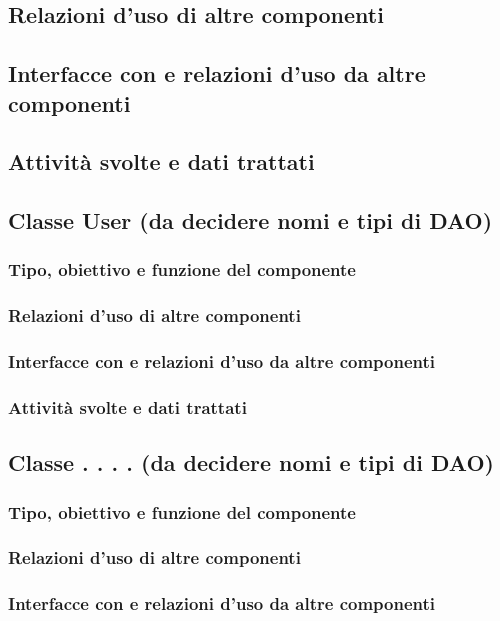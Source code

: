 \subsection*{Relazioni d'uso di altre componenti}
\subsection*{Interfacce con e relazioni d'uso da altre componenti}
\subsection*{Attivit\`a svolte e dati trattati}

\subsection{Classe User (da decidere nomi e tipi di DAO)}
\subsubsection*{Tipo, obiettivo e funzione del componente}
\subsubsection*{Relazioni d'uso di altre componenti}
\subsubsection*{Interfacce con e relazioni d'uso da altre componenti}
\subsubsection*{Attivit\`a svolte e dati trattati}

\subsection{Classe . . . . (da decidere nomi e tipi di DAO)}
\subsubsection*{Tipo, obiettivo e funzione del componente}
\subsubsection*{Relazioni d'uso di altre componenti}
\subsubsection*{Interfacce con e relazioni d'uso da altre componenti}
